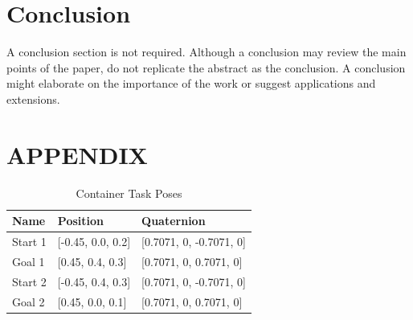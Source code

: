 \documentclass[letterpaper, 10 pt, conference]{ieeeconf}  %
\begin{document}
\section{Conclusion}

A conclusion section is not required. Although a conclusion may review the main points of the paper, do not replicate the abstract as the conclusion. A conclusion might elaborate on the importance of the work or suggest applications and extensions. 

\addtolength{\textheight}{-12cm}   %







\section*{APPENDIX}

\begin{table}[H]
    \centering
    \caption{Container Task Poses}
    \label{tab:containerPoses}
    \begin{tabular}{lll}
    \hline
    \textbf{Name} & \textbf{Position} & \textbf{Quaternion} \\
    \hline
    Start 1 & [-0.45, 0.0, 0.2] & [0.7071, 0, -0.7071, 0] \\
    Goal 1 & [0.45, 0.4, 0.3] & [0.7071, 0, 0.7071, 0] \\
    Start 2 & [-0.45, 0.4, 0.3] & [0.7071, 0, -0.7071, 0] \\
    Goal 2 & [0.45, 0.0, 0.1] & [0.7071, 0, 0.7071, 0] \\
    \hline
    \end{tabular}
\end{table}
\end{document}
